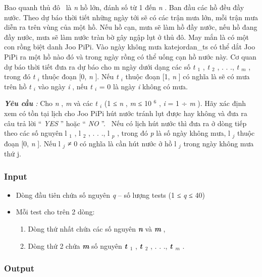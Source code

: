 

Bao quanh thủ đô  là \emph{ n } hồ lớn, đánh số từ 1 đến \emph{ n } . Ban đầu các hồ đều đầy nước. Theo dự báo thời tiết những ngày tới sẽ có các trận mưa lớn, mỗi trận mưa diễn ra trên vùng của một hồ. Nếu hồ cạn, mưa sẽ làm hồ đầy nước, nếu hồ đang đầy nước, mưa sẽ làm nước tràn bờ gây ngập lụt ở thủ đô. May mắn là có một con rồng biệt danh Joo PiPi. Vào ngày không mưa katejordan\_ts có thể dắt Joo PiPi ra một hồ nào đó và trong ngày rồng có thể uống cạn hồ nước này. Cơ quan dự báo thời tiết đưa ra dự báo cho m ngày dưới dạng các số \emph{ t $_ 1 $} , \emph{ t $_ 2 $} , . . ., \emph{ t $_ m $} , trong đó \emph{ t $_ i $} thuộc đoạn [0, \emph{ n } ]. Nếu \emph{ t $_ i $} thuộc đoạn [1, \emph{ n } ] có nghĩa là sẽ có mưa trên hồ \emph{ t $_ i $} vào ngày \emph{ i } , nếu \emph{ t $_ i $} = 0 là ngày \emph{ i } không có mưa.

\emph{\textbf{Yêu cầu } : } Cho \emph{ n } , \emph{ m } và các \emph{ t $_ i $} (1 ≤ \emph{ n } , \emph{ m } ≤ 10 $^ 6 $ , \emph{ i } = 1 ÷ \emph{ m } ). Hãy xác định xem có tồn tại lịch cho Joo PiPi hút nước tránh lụt được hay không và đưa ra câu trả lời “ \emph{ YES } ” hoặc “ \emph{ NO } ”.  Nếu có lịch hút nước thì đưa ra ở dòng tiếp theo các số nguyên l $_ 1 $ , l $_ 2 $ , . . ., l \emph{$_ p $} , trong đó \emph{ p } là số ngày không mưa, l \emph{$_ j $} thuộc đoạn [0, \emph{ n } ]. Nếu l \emph{$_ j $} ≠ 0 có nghĩa là cần hút nước ở hồ l \emph{$_ j $} trong ngày không mưa thứ j.

\subsubsection{Input}
\begin{itemize}
	\item 

Dòng đầu tiên chứa số nguyên \emph{ q } – số lượng tests (1 ≤ \emph{ q } ≤ 40)
	\item Mỗi test cho trên 2 dòng:
\begin{enumerate}
	\item Dòng thứ nhất chứa các số nguyên \textbf{\emph{ n }} và \textbf{\emph{ m }} ,
	\item Dòng thứ 2 chứa \textbf{\emph{ m }} số nguyên \textbf{\emph{ t $_ 1 $}} , \textbf{\emph{ t $_ 2 $}} , . . ., \textbf{\emph{ t $_ m $}} .
\end{enumerate}
\end{itemize}

\subsubsection{Output}

